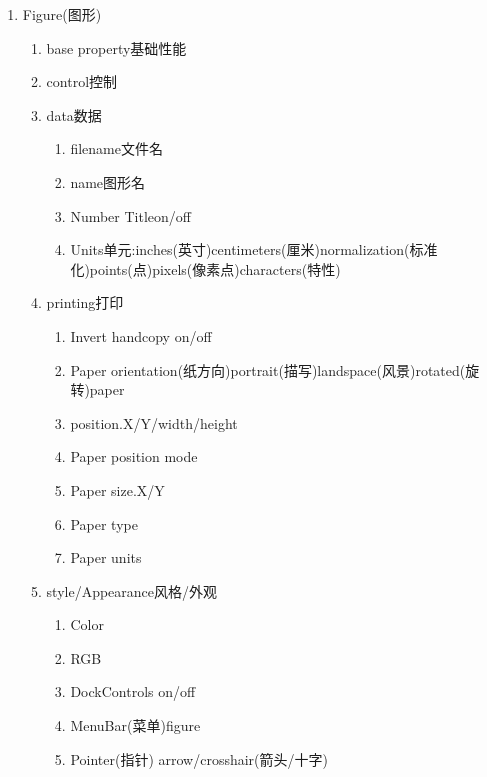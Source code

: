         \begin{enumerate}
          \item Figure(图形)
            \begin{enumerate}
               \item base property\quad 基础性能
                \item control\quad 控制
                \item data\quad 数据
                  \begin{enumerate}
                   \item filename\qquad 文件名
                   \item name\qquad 图形名
                   \item Number Title\qquad on/off
                   \item Units单元:inches(英寸)centimeters(厘米)normalization(标准化)points(点)pixels(像素点)characters(特性)
                   \end{enumerate}
               \item printing\quad 打印
               \begin{enumerate}
                   \item  Invert handcopy  on/off
                   \item Paper orientation(纸方向)portrait(描写)landspace(风景)rotated(旋转)paper
                   \item position.X/Y/width/height
                   \item Paper position mode
                   \item Paper size.X/Y
                   \item Paper type
                   \item Paper units
                   \end{enumerate}
                \item style/Appearance\quad 风格/外观
                  \begin{enumerate}
                   \item  Color
                   \item RGB
                   \item DockControls  on/off
                   \item MenuBar(菜单)\qquad figure
                   \item Pointer(指针) \qquad arrow/crosshair(箭头/十字)
                   \end{enumerate}
            \end{enumerate}
        \end{enumerate}

